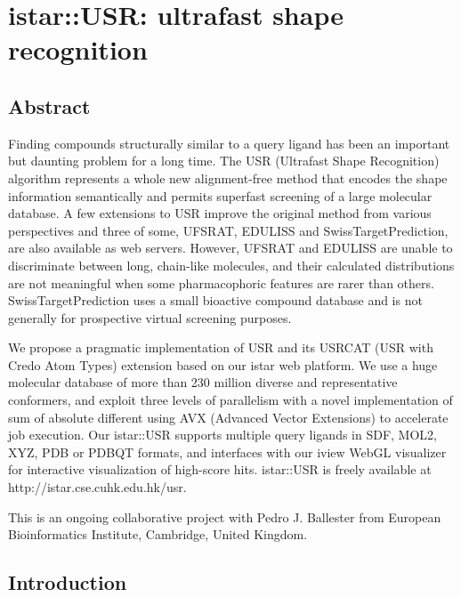 \chapter{istar::USR: ultrafast shape recognition}

\section{Abstract}

Finding compounds structurally similar to a query ligand has been an important but daunting problem for a long time. The USR (Ultrafast Shape Recognition) algorithm represents a whole new alignment-free method that encodes the shape information semantically and permits superfast screening of a large molecular database. A few extensions to USR improve the original method from various perspectives and three of some, UFSRAT, EDULISS and SwissTargetPrediction, are also available as web servers. However, UFSRAT and EDULISS are unable to discriminate between long, chain-like molecules, and their calculated distributions are not meaningful when some pharmacophoric features are rarer than others. SwissTargetPrediction uses a small bioactive compound database and is not generally for prospective virtual screening purposes.

We propose a pragmatic implementation of USR and its USRCAT (USR with Credo Atom Types) extension based on our istar web platform. We use a huge molecular database of more than 230 million diverse and representative conformers, and exploit three levels of parallelism with a novel implementation of sum of absolute different using AVX (Advanced Vector Extensions) to accelerate job execution. Our istar::USR supports multiple query ligands in SDF, MOL2, XYZ, PDB or PDBQT formats, and interfaces with our iview WebGL visualizer for interactive visualization of high-score hits. istar::USR is freely available at http://istar.cse.cuhk.edu.hk/usr.

This is an ongoing collaborative project with Pedro J. Ballester from European Bioinformatics Institute, Cambridge, United Kingdom.

\section{Introduction}

